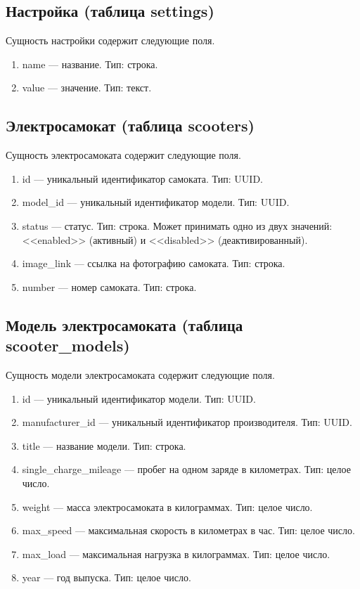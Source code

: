 \subsection{Настройка (таблица settings)}

Сущность настройки содержит следующие поля.

\begin{enumerate}
    \item name --- название. Тип: строка.
    \item value --- значение. Тип: текст.
\end{enumerate}

\subsection{Электросамокат (таблица scooters)}

Сущность электросамоката содержит следующие поля.

\begin{enumerate}
    \item id --- уникальный идентификатор самоката. Тип: UUID.
    \item model\_id --- уникальный идентификатор модели. Тип: UUID.
    \item status --- статус. Тип: строка. Может принимать одно из двух значений: <<enabled>> (активный) и <<disabled>> (деактивированный).
    \item image\_link --- ссылка на фотографию самоката. Тип: строка.
    \item number --- номер самоката. Тип: строка.
\end{enumerate}

\subsection{Модель электросамоката (таблица scooter\_models)}

Сущность модели электросамоката содержит следующие поля.

\begin{enumerate}
    \item id --- уникальный идентификатор модели. Тип: UUID.
    \item manufacturer\_id --- уникальный идентификатор производителя. Тип: UUID.
    \item title --- название модели. Тип: строка.
    \item single\_charge\_mileage --- пробег на одном заряде в километрах. Тип: целое число.
    \item weight --- масса электросамоката в килограммах. Тип: целое число.
    \item max\_speed --- максимальная скорость в километрах в час. Тип: целое число.
    \item max\_load --- максимальная нагрузка в килограммах. Тип: целое число.
    \item year --- год выпуска. Тип: целое число.
\end{enumerate}

